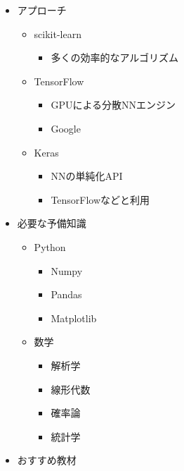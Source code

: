 \begin{itemize}
\tightlist
\item
  アプローチ

  \begin{itemize}
  \tightlist
  \item
    scikit-learn

    \begin{itemize}
    \tightlist
    \item
      多くの効率的なアルゴリズム
    \end{itemize}
  \item
    TensorFlow

    \begin{itemize}
    \tightlist
    \item
      GPUによる分散NNエンジン
    \item
      Google
    \end{itemize}
  \item
    Keras

    \begin{itemize}
    \tightlist
    \item
      NNの単純化API
    \item
      TensorFlowなどと利用
    \end{itemize}
  \end{itemize}
\item
  必要な予備知識

  \begin{itemize}
  \tightlist
  \item
    Python

    \begin{itemize}
    \tightlist
    \item
      Numpy
    \item
      Pandas
    \item
      Matplotlib
    \end{itemize}
  \item
    数学

    \begin{itemize}
    \tightlist
    \item
      解析学
    \item
      線形代数
    \item
      確率論
    \item
      統計学
    \end{itemize}
  \end{itemize}
\item
  おすすめ教材


\end{itemize}
